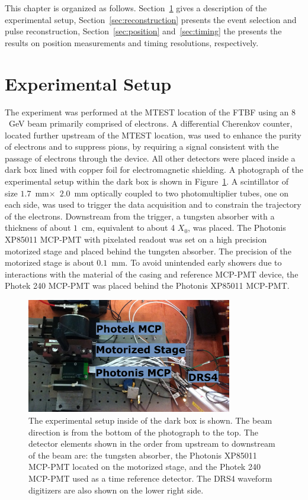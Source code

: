 This chapter is organized as follows. Section~\ref{sec:setup} gives a
description of the
experimental setup,
Section~\ref{sec:reconstruction} presents the event selection and pulse
reconstruction, Section~\ref{sec:position} and~\ref{sec:timing} the
presents the results on position measurements and timing resolutions, respectively. 

\section{Experimental Setup} \label{sec:setup} The experiment was performed at
the MTEST location of the FTBF using an $8$~GeV beam
primarily comprised of electrons. A differential Cherenkov counter, located
further upstream of the MTEST location, was used to enhance the purity of
electrons and to suppress pions, by requiring a signal consistent with the passage
of electrons through the device. All other detectors were placed inside a dark
box lined with copper foil for electromagnetic shielding. A photograph of the
experimental setup within the dark box is shown in Figure~\ref{fig:setup}. A
scintillator of size $1.7$~mm$\times$~$2.0$~mm optically coupled to two
photomultiplier tubes, one on each side, was used to trigger the data
acquisition and to constrain the trajectory of the electrons. Downstream from the trigger, a tungsten absorber with a thickness of about $1$~cm,
equivalent to about 4 $X_{0}$, was placed. The Photonis XP85011
MCP-PMT with pixelated readout was set on a high precision motorized stage and
placed behind the tungsten absorber. The precision of the motorized stage is
about $0.1$~mm. To avoid unintended early showers due to interactions with the
material of the casing and reference MCP-PMT device, the Photek 240
MCP-PMT was placed behind the Photonis XP85011 MCP-PMT. 
\begin{figure}[h] 
\centering
\includegraphics[width=0.8\textwidth]{Images/setup/setup.png} 
\caption{The experimental setup inside of the dark box is shown. The beam direction is from
the bottom of the photograph to the top. The detector elements shown in the
order from upstream to downstream of the beam are: the tungsten absorber, the
Photonis XP85011 MCP-PMT located on the motorized stage, and the Photek 240
MCP-PMT used as a time reference detector. The DRS4 waveform digitizers are also
shown on the lower right side.} 
\label{fig:setup} 
\end{figure} 

